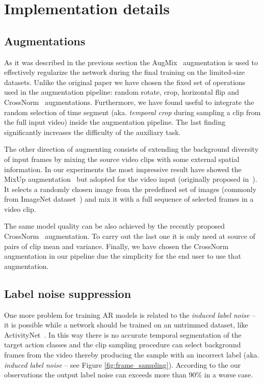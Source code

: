 \documentclass[twoside, twocolumn]{article}
\begin{document}
\section{Implementation details}

\subsection{Augmentations}

\lettrine[nindent=0em,lines=3]{A}{}s it was described in the previous section the AugMix~\cite{AugMix} augmentation is
used to effectively regularize the network during the final training on the limited-size datasets. Unlike the original
paper we have chosen the fixed set of operations used in the augmentation pipeline: random rotate, crop, horizontal flip
and CrossNorm~\cite{CrossNorm} augmentations. Furthermore, we have found useful to integrate the random selection of
time segment (aka. \textit{temporal crop} during sampling a clip from the full input video) inside the augmentation
pipeline. The last finding significantly increases the difficulty of the auxiliary task.

The other direction of augmenting consists of extending the background diversity of input frames by mixing the source
video clips with some external spatial information. In our experiments the most impressive result have showed the
MixUp augmentation~\cite{MixUp} but adopted for the video input (originally proposed in~\cite{ASLNet}). It selects a
randomly chosen image from the predefined set of images (commonly from ImageNet dataset~\cite{ImageNet}) and mix it
with a full sequence of selected frames in a video clip.

The same model quality can be also achieved by the recently proposed CrossNorm~\cite{CrossNorm} augmentation. To carry
out the last one it is only need at source of pairs of clip mean and variance. Finally, we have chosen the CrossNorm
augmentation in our pipeline due the simplicity for the end user to use that augmentation.

\subsection{Label noise suppression} \label{noise_suppression}

\lettrine[nindent=0em,lines=3]{O}{}ne more problem for training AR models is related to the \textit{induced label noise}
-- it is possible while a network should be trained on an untrimmed dataset, like ActivityNet~\cite{ActivityNet}. In
this way there is no accurate temporal segmentation of the target action classes and the clip sampling procedure can
select background frames from the video thereby producing the sample with an incorrect label (aka. \textit{induced
label noise} -- see Figure \ref{fig:frame_sampling}). According to the our observations the output label noise can
exceeds more than $90\%$ in a worse case.
\end{document}
